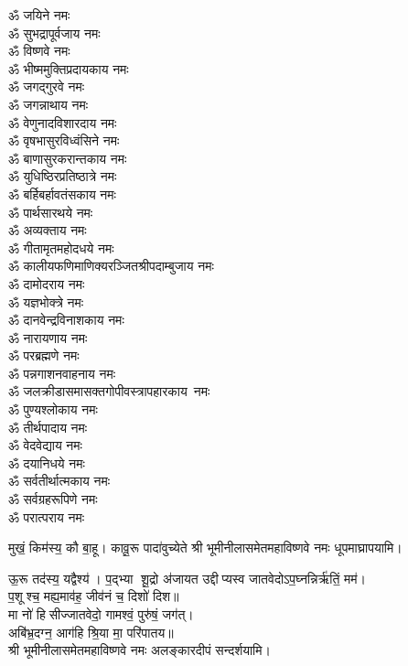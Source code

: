 \begin{center}
\begin{multicols}{2}
\begin{flushleft}
ॐ जयिने नमः\hfill{}\\
ॐ सुभद्रापूर्वजाय नमः\\
ॐ विष्णवे नमः\\
ॐ भीष्ममुक्तिप्रदायकाय नमः\\
ॐ जगद्गुरवे नमः\\
ॐ जगन्नाथाय नमः\\
ॐ वेणुनादविशारदाय नमः\\
ॐ वृषभासुरविध्वंसिने नमः\\
ॐ बाणासुरकरान्तकाय नमः\\
ॐ युधिष्ठिरप्रतिष्ठात्रे नमः\\
ॐ बर्हिबर्हावतंसकाय नमः\hfill{}\\
ॐ पार्थसारथये नमः\\
ॐ अव्यक्ताय नमः\\
ॐ गीतामृतमहोदधये नमः\\
ॐ कालीयफणिमाणिक्य\-रञ्जित\-श्री\-पदाम्बुजाय नमः\\
ॐ दामोदराय नमः\\
ॐ यज्ञभोक्त्रे नमः\\
ॐ दानवेन्द्रविनाशकाय नमः\\
ॐ नारायणाय नमः\\
ॐ परब्रह्मणे नमः\\
ॐ पन्नगाशनवाहनाय नमः\hfill{}\\
ॐ जलक्रीडासमासक्त\-गोपी\-वस्त्रापहारकाय~नमः\\
ॐ पुण्यश्लोकाय नमः\\
ॐ तीर्थपादाय नमः\\
ॐ वेदवेद्याय नमः\\
ॐ दयानिधये नमः\\
ॐ सर्वतीर्थात्मकाय नमः\\
ॐ सर्वग्रहरूपिणे नमः\\
ॐ परात्पराय नमः\hfill{}\\
\end{flushleft}
\end{multicols}

  
{मुखं॒ किम॑स्य॒ कौ बा॒हू। कावू॒रू पादा॑वुच्येते}
श्री भूमीनीलासमेतमहाविष्णवे नमः धूपमाघ्रापयामि।\medskip
 
{ऊ॒रू तद॑स्य॒ यद्वैश्य॑। प॒द्भ्या शू॒द्रो अ॑जायत}
उद्दीप्यस्व जातवेदोऽप॒घ्नन्निर्ऋ॑तिं॒ मम॑।\\
 प॒शूश्च॒ मह्य॒माव॑ह॒ जीव॑नं च॒ दिशो॑ दिश॥ \\
मा नो॑ हिसीज्जातवेदो॒ गामश्वं॒ पुरु॑षं॒ जग॑त्।\\
अबि॑भ्र॒दग्न॒ आग॑हि श्रि॒या मा॒ परि॑पातय॥ \\
श्री भूमीनीलासमेतमहाविष्णवे नमः अलङ्कारदीपं सन्दर्शयामि।\medskip


\end{center}
